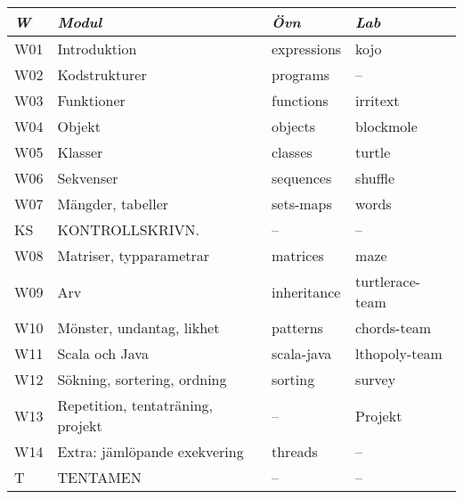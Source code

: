 \begin{tabular}{l|l|l|l}
\textit{W} & \textit{Modul} & \textit{Övn} & \textit{Lab} \\ \hline \hline
W01 & Introduktion & expressions & kojo \\
W02 & Kodstrukturer & programs & -- \\
W03 & Funktioner & functions & irritext \\
W04 & Objekt & objects & blockmole \\
W05 & Klasser & classes & turtle \\
W06 & Sekvenser & sequences & shuffle \\
W07 & Mängder, tabeller & sets-maps & words \\
KS & KONTROLLSKRIVN. & -- & -- \\
W08 & Matriser, typparametrar & matrices & maze \\
W09 & Arv & inheritance & turtlerace-team \\
W10 & Mönster, undantag, likhet & patterns & chords-team \\
W11 & Scala och Java & scala-java & lthopoly-team \\
W12 & Sökning, sortering, ordning & sorting & survey \\
W13 & Repetition, tentaträning, projekt & -- & Projekt \\
W14 & Extra: jämlöpande exekvering & threads & -- \\
T & TENTAMEN & -- & -- \\
\end{tabular}
